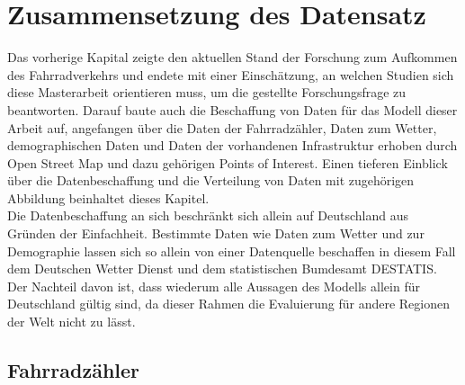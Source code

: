 \documentclass[a4paper,12pt]{thesis}
\begin{document}
\chapter{Zusammensetzung des Datensatz}\label{Datensatz}

Das vorherige Kapital zeigte den aktuellen Stand der Forschung zum Aufkommen des Fahrradverkehrs und endete mit einer Einschätzung, an welchen Studien sich diese Masterarbeit orientieren muss, um die gestellte Forschungsfrage zu beantworten. Darauf baute auch die Beschaffung von Daten für das Modell dieser Arbeit auf, angefangen über die Daten der Fahrradzähler, Daten zum Wetter, demographischen Daten und Daten der vorhandenen Infrastruktur erhoben durch Open Street Map und dazu gehörigen Points of Interest. Einen tieferen Einblick über die Datenbeschaffung und die Verteilung von Daten mit zugehörigen Abbildung beinhaltet dieses Kapitel.\\
Die Datenbeschaffung an sich beschränkt sich allein auf Deutschland aus Gründen der Einfachheit. Bestimmte Daten wie Daten zum Wetter und zur Demographie lassen sich so allein von einer Datenquelle beschaffen in diesem Fall dem Deutschen Wetter Dienst und dem statistischen Bumdesamt DESTATIS. Der Nachteil davon ist, dass wiederum alle Aussagen des Modells allein für Deutschland gültig sind, da dieser Rahmen die Evaluierung für andere Regionen der Welt nicht zu lässt.

\section{Fahrradzähler}
\end{document}
